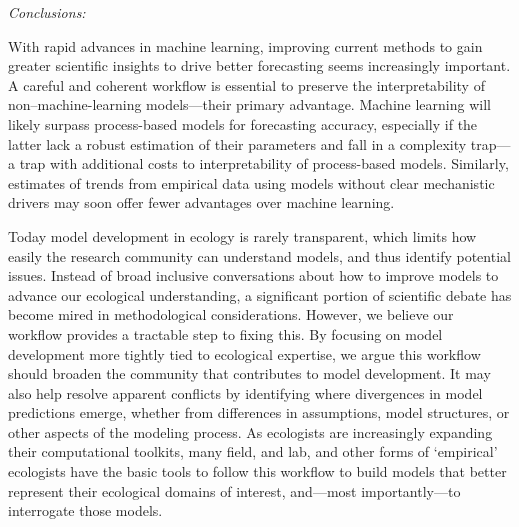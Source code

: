 \documentclass[11pt]{article}
\newcommand{\llabel}[1]{\hypertarget{lintarget:#1}{}\linelabel{lin:#1}}
\begin{document}
\emph{Conclusions:} 

With rapid advances in machine learning, improving current methods to gain greater scientific insights to drive better forecasting seems increasingly important. \llabel{clearerML} A careful and coherent workflow is essential to preserve the interpretability of non–machine-learning models---their primary advantage. \llabel{MLvsPBM}Machine learning will likely surpass process-based models for forecasting accuracy, especially if the latter lack a robust estimation of their parameters and fall in a complexity trap---a trap with additional costs to interpretability of process-based models. Similarly, estimates of trends from empirical data using models without clear mechanistic drivers may soon offer fewer advantages over machine learning. 


Today model development in ecology is rarely transparent, which limits how easily the research community can understand models, and thus identify potential issues. Instead of broad inclusive conversations about how to improve models to advance our ecological understanding, a significant portion of scientific debate has become mired in methodological considerations. However, we believe our workflow provides a tractable step to fixing this. By focusing on model development more tightly tied to ecological expertise, we argue this workflow should broaden the community that contributes to model development. It may also help resolve apparent conflicts by identifying where divergences in model predictions emerge, whether from differences in assumptions, model structures, or other aspects of the modeling process.
As ecologists are increasingly expanding their computational toolkits, many field, and lab, and other forms of `empirical' ecologists have the basic tools to follow this workflow to build models that better represent their ecological domains of interest, and---most importantly---to interrogate those models.
\end{document}
